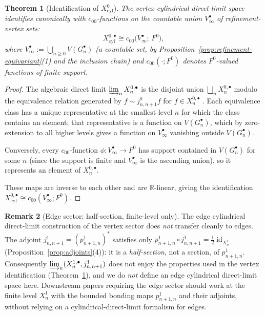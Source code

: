 \documentclass[11pt, a4paper]{amsart}
\newtheorem{theorem}{Theorem}[section]
\theoremstyle{definition}
\newtheorem{remark}[theorem]{Remark}
\newcommand{\R}{\mathbb{R}}
\newcommand{\id}{\operatorname{id}}
\newcommand{\cyl}{\mathrm{cyl}}
\begin{document}
\begin{theorem}[Identification of $X_\cyl^0$]
\label{thm:Xcyl-direct-limit}
The vertex cylindrical direct-limit space identifies canonically
with $c_{00}$-functions on the countable union $V_\infty^\bullet$
of refinement-vertex sets:
\[
  X_\cyl^{0, \bullet} \cong c_{00}\bigl(V_\infty^\bullet;\, F^0\bigr),
\]
where $V_\infty^\bullet := \bigcup_{n \geq 0} V(G_n^\bullet)$
(a countable set, by Proposition~\ref{prop:refinement-equivariant}(1)
and the inclusion chain) and $c_{00}(\cdot; F^0)$ denotes
$F^0$-valued functions of finite support.
\end{theorem}

\begin{proof}
The algebraic direct limit $\varinjlim_n X_n^{0, \bullet}$ is the
disjoint union $\bigsqcup_n X_n^{0, \bullet}$ modulo the
equivalence relation generated by $f \sim j_{n, n+1}^0 f$ for
$f \in X_n^{0, \bullet}$ \cite[Ch.~II.1.4]{ReedSimonI}. Each
equivalence class has a unique representative at the smallest
level $n$ for which the class contains an element; that
representative is a function on $V(G_n^\bullet)$, which by
zero-extension to all higher levels gives a function on
$V_\infty^\bullet$ vanishing outside $V(G_n^\bullet)$.

Conversely, every $c_{00}$-function $\phi \colon V_\infty^\bullet
\to F^0$ has support contained in $V(G_n^\bullet)$ for some
$n$ (since the support is finite and $V_\infty^\bullet$ is the
ascending union), so it represents an element of $X_n^{0, \bullet}$.

These maps are inverse to each other and are $\R$-linear, giving
the identification $X_\cyl^{0, \bullet} \cong c_{00}(V_\infty^
\bullet; F^0)$.
\end{proof}

\begin{remark}[Edge sector: half-section, finite-level only]
\label{rmk:edge-cyl}
The edge cylindrical direct-limit construction of the vertex
sector does \emph{not} transfer cleanly to edges. The adjoint
$j_{n, n+1}^1 = (p_{n+1, n}^1)^*$ satisfies only
$p_{n+1, n}^1 \circ j_{n, n+1}^1 = \tfrac{1}{2}\id_{X_n^1}$
(Proposition~\ref{prop:adjoints}(4)): it is a \emph{half-section},
not a section, of $p_{n+1, n}^1$. Consequently
$\varinjlim_n(X_n^{1, \bullet}, j_{n, n+1}^1)$ does not enjoy the
properties used in the vertex identification
(Theorem~\ref{thm:Xcyl-direct-limit}), and we do \emph{not} define an edge
cylindrical direct-limit space here. Downstream papers requiring
the edge sector should work at the finite level $X_n^1$ with the
bounded bonding maps $p_{n+1, n}^1$ and their adjoints, without
relying on a cylindrical-direct-limit formalism for edges.
\end{remark}
\end{document}
